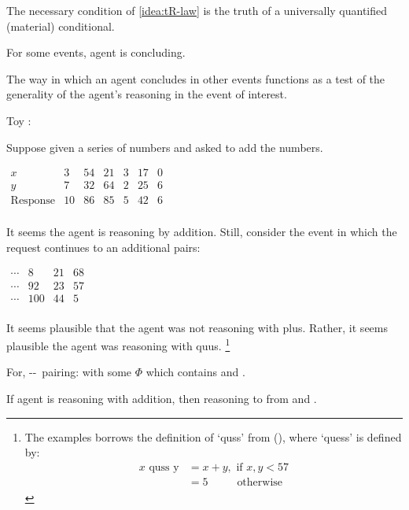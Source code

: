 \begin{note}
  \noindent%
  The necessary condition of \autoref{idea:tR-law} is the truth of a universally quantified (material) conditional.

  For some events, agent is concluding.

  The way in which an agent concludes in other events functions as a test of the generality of the agent's reasoning in the event of interest.

  Toy :

  \begin{illustration}[Numbers]
    Suppose given a series of numbers and asked to add the numbers.

    \medskip
    \qquad\qquad%
    \(
      \begin{array}{ccccccc}
      x & 3 & 54 & 21 & 3 & 17 & 0 \\
      y & 7 & 32 & 64 & 2 & 25 & 6 \\
      \hline
      \text{Response} & 10 & 86 & 85 & 5 & 42 & 6 \\
    \end{array}
    \)
    \medskip

    \noindent%
    It seems the agent is reasoning by addition.
    Still, consider the event in which the request continues to an additional pairs:

    \medskip
    \hfill%
    \(
    \begin{array}{cccc}
      \cdots & 8 & 21 & 68  \\
      \cdots & 92 & 23 & 57 \\
      \hline
      \cdots & 100 & 44 & 5 \\
    \end{array}
    \)%
    \qquad\qquad
    \medskip

    \noindent%
    It seems plausible that the agent was not reasoning with plus.
    Rather, it seems plausible the agent was reasoning with quus.%
    \footnote{
      The examples borrows the definition of `quss' from \citeauthor{Kripke:1982aa} (\citeyear{Kripke:1982aa}), where `quess' is defined by:
      \begin{align*}
        x \text{ quss y} &= x + y, \text{ if } x,y < 57 \\
                         &= 5 \phantom{ if x,,} \text{ otherwise }
      \end{align*}
      \vspace{-\baselineskip}
    }

    For, --~pairing:
     with some \pool{} \(\Phi\) which contains  and .

    If agent is reasoning with addition, then reasoning to  from  and .
  \end{illustration}
\end{note}

